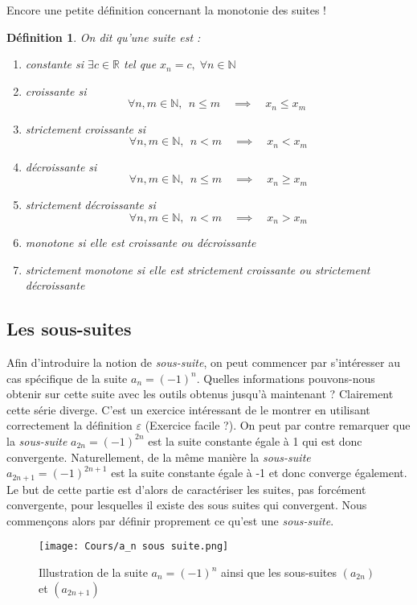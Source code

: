 \documentclass[a4paper, 12pt, french, twoside]{article}
\newtheorem{defi}[theorem]{Définition}
\newcommand{\Nn}{{\mathbb{N}}}
\newcommand{\Rr}{{\mathbb{R}}}
\begin{document}
Encore une petite définition concernant la monotonie des suites !


\begin{defi}
    On dit qu'une suite est :
    \begin{enumerate}
        \item constante si $\exists c\in \Rr $ tel que $x_n=c, \; \forall n \in \Nn $
        \item croissante si
        \[\forall n,m \in \Nn, ~~n\leq m\quad\implies\quad x_n\leq x_m \;  \]
        \item strictement croissante si
        \[\forall n,m \in \Nn, ~~n< m\quad\implies\quad x_n< x_m \]
        \item décroissante si
        \[\forall n,m \in \Nn, ~~n\leq m\quad\implies\quad x_n\geq x_m\]
        \item strictement décroissante si
        \[\forall n,m \in \Nn, ~~n< m\quad\implies\quad x_n> x_m \]
        \item monotone si elle est croissante ou décroissante
        \item strictement monotone si elle est strictement croissante ou strictement décroissante
    \end{enumerate}
\end{defi}


\subsection{Les sous-suites}
Afin d'introduire la notion de \textit{sous-suite}, on peut commencer par s'intéresser au cas spécifique de la suite $a_n = (-1)^n$. Quelles informations pouvons-nous obtenir sur cette suite avec les outils obtenus jusqu'à maintenant ? 
Clairement cette série diverge. C'est un exercice intéressant de le montrer en utilisant correctement la définition $\varepsilon$ (Exercice facile ?). On peut par contre remarquer que la \textit{sous-suite} $a_{2n} = (-1)^{2n}$ est la suite constante égale à 1 qui est donc convergente. Naturellement, de la même manière la \textit{sous-suite} $a_{2n+1} = (-1)^{2n+1}$ est la suite constante égale à -1 et donc converge également. Le but de cette partie est d'alors de caractériser les suites, pas forcément convergente, pour lesquelles il existe des sous suites qui convergent. Nous commençons alors par définir proprement ce qu'est une \textit{sous-suite}.
\begin{figure}[H]
    \centering
    \texttt{[image: Cours/a\_n sous suite.png]}
    \caption{Illustration de la suite $a_n = (-1)^n$ ainsi que les sous-suites $(a_{2n})$ et $(a_{2n+1})$ }
    \label{fig:enter-label}
\end{figure}
\end{document}

